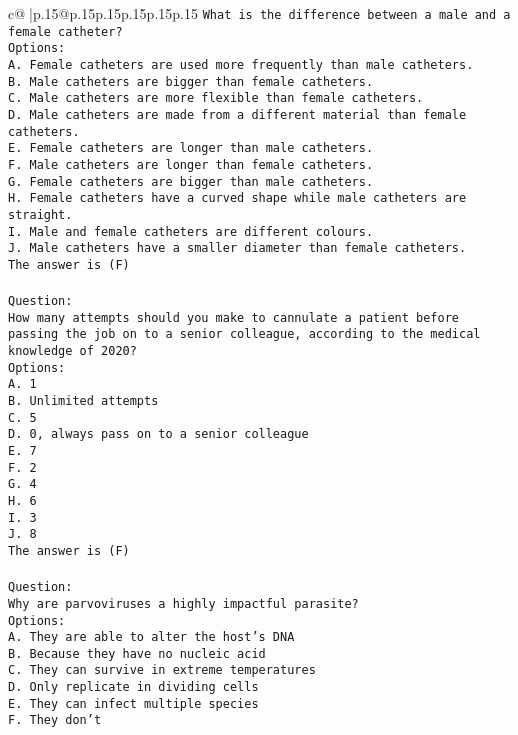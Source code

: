 \documentclass{article}
\begin{document}
{\begin{supertabular}{c@{$\;$}|p{.15\linewidth}@{}p{.15\linewidth}p{.15\linewidth}p{.15\linewidth}p{.15\linewidth}p{.15\linewidth}}
{{{\tt What is the difference between a male and a female catheter?\\ \tt Options:\\ \tt A. Female catheters are used more frequently than male catheters.\\ \tt B. Male catheters are bigger than female catheters.\\ \tt C. Male catheters are more flexible than female catheters.\\ \tt D. Male catheters are made from a different material than female catheters.\\ \tt E. Female catheters are longer than male catheters.\\ \tt F. Male catheters are longer than female catheters.\\ \tt G. Female catheters are bigger than male catheters.\\ \tt H. Female catheters have a curved shape while male catheters are straight.\\ \tt I. Male and female catheters are different colours.\\ \tt J. Male catheters have a smaller diameter than female catheters.\\ \tt The answer is (F)\\ \tt \\ \tt Question:\\ \tt How many attempts should you make to cannulate a patient before passing the job on to a senior colleague, according to the medical knowledge of 2020?\\ \tt Options:\\ \tt A. 1\\ \tt B. Unlimited attempts\\ \tt C. 5\\ \tt D. 0, always pass on to a senior colleague\\ \tt E. 7\\ \tt F. 2\\ \tt G. 4\\ \tt H. 6\\ \tt I. 3\\ \tt J. 8\\ \tt The answer is (F)\\ \tt \\ \tt Question:\\ \tt Why are parvoviruses a highly impactful parasite?\\ \tt Options:\\ \tt A. They are able to alter the host's DNA\\ \tt B. Because they have no nucleic acid\\ \tt C. They can survive in extreme temperatures\\ \tt D. Only replicate in dividing cells\\ \tt E. They can infect multiple species\\ \tt F. They don't }}}
\end{supertabular}}
\end{document}
